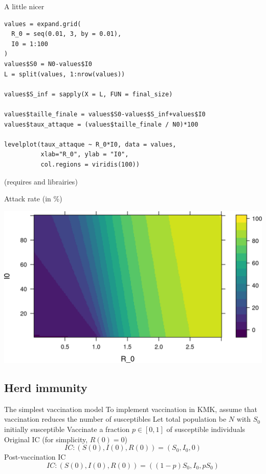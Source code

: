 \documentclass[aspectratio=43]{beamer}
\begin{document}
\begin{frame}[fragile]{A little nicer}
\begin{lstlisting}
values = expand.grid(
  R_0 = seq(0.01, 3, by = 0.01),
  I0 = 1:100
)
values$S0 = N0-values$I0
L = split(values, 1:nrow(values))

values$S_inf = sapply(X = L, FUN = final_size)

values$taille_finale = values$S0-values$S_inf+values$I0
values$taux_attaque = (values$taille_finale / N0)*100

levelplot(taux_attaque ~ R_0*I0, data = values, 
          xlab="R_0", ylab = "I0",
          col.regions = viridis(100))  
\end{lstlisting}
(requires  and  librairies)
\end{frame}


\begin{frame}{Attack rate (in \%)}
  \begin{center}
    \includegraphics[width=\textwidth]{../FIGS/KMK_taux_attaque}
  \end{center}
\end{frame}


\subsection{Herd immunity}

\begin{frame}{The simplest vaccination model}
To implement vaccination in KMK, assume that vaccination reduces the number of susceptibles
\vfill
Let total population be $N$ with $S_0$ initially susceptible
\vfill
Vaccinate a fraction $p\in[0,1]$ of susceptible individuals
\vfill
Original IC (for simplicity, $R(0)=0$)
\begin{equation}\label{eq:IC_KMK_novacc}
IC: (S(0),I(0),R(0)) = (S_0,I_0,0)
\end{equation}
Post-vaccination IC 
\begin{equation}\label{eq:IC_KMK_vacc}
IC: (S(0),I(0),R(0)) = ((1-p)S_0,I_0,pS_0)
\end{equation}
\end{frame}
\end{document}
